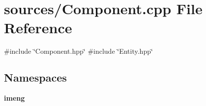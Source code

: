 \section{sources/\+Component.cpp File Reference}
\label{_component_8cpp}
{\ttfamily \#include \char`\"{}Component.\+hpp\char`\"{}}\newline
{\ttfamily \#include \char`\"{}Entity.\+hpp\char`\"{}}\newline
\subsection*{Namespaces}
\begin{DoxyCompactItemize}
\item 
 \textbf{ imeng}
\end{DoxyCompactItemize}
